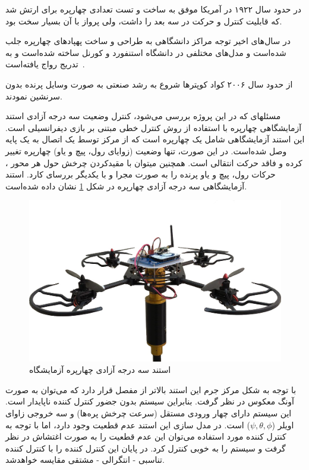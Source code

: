در حدود سال ۱۹۲۲ در آمریکا  موفق به ساخت و تست تعدادی چهارپره برای ارتش شد که قابلیت کنترل و حرکت در سه بعد را داشت، ولی پرواز با آن بسیار سخت بود.

در سال‌های اخیر توجه مراکز دانشگاهی به طراحی و ساخت پهپادهای چهارپره جلب شده‌است و مدل‌های مختلفی در دانشگاه استنفورد و کورنل ساخته شده‌است و به تدریج رواج یافته‌است~\cite{5717652}.

از حدود سال ۲۰۰۶ کواد کوپترها شروع به رشد صنعتی به صورت وسایل پرنده بدون سرنشین نمودند.


مسئلهای که در این پروژه بررسی می‌شود، کنترل وضعیت سه درجه آزادی استند آزمایشگاهی چهارپره با استفاده از روش کنترل خطی مبتنی بر بازی دیفرانسیلی است. این استند آزمایشگاهی شامل یک چهارپره است که از 
مرکز توسط یک اتصال به یک پایه وصل شده‌است. در این صورت، تنها وضعیت (زوایای رول، پیچ و یاو) 
چهارپره تغییر کرده و فاقد حرکت انتقالی است. همچنین میتوان با مقیدکردن چرخش حول هر محور ، 
حرکات رول، پیچ و یاو پرنده را به صورت مجرا و با یکدیگر بررسای کارد.
استند آزمایشگاهی سه درجه آزادی چهارپره در شکل \ref{LabQuad} نشان داده شده‌است.

\begin{figure}[H]\label{LabQuad}
	\includegraphics[width=12cm]{figs/introduction/3DOFQuad.jpg}
	\centering
	\caption{استند سه درجه آزادی چهارپره آزمایشگاه\cite{Iranlabexpo}}
\end{figure}
با توجه به شکل مرکز جرم این استند بالاتر از مفصل قرار دارد که می‌توان به صورت آونگ معکوس در نظر گرفت. بنابراین سیستم بدون جضور کنترل کننده ناپایدار است. این سیستم دارای چهار ورودی مستقل (سرعت چرخش پره‌ها) و سه خروجی زاوای اویلر ($\psi, \theta, \phi$) است. در مدل سازی این استند عدم قطعیت وجود دارد، اما با توجه به کنترل کننده مورد استفاده می‌توان این عدم قطعیت را به صورت اغتشاش در نظر گرفت و سیستم را به خوبی کنترل کرد. در پایان این کنترل کننده را با کنترل کننده تناسبی - انتگرالی -
مشتقی مقایسه خواهد‌شد.
